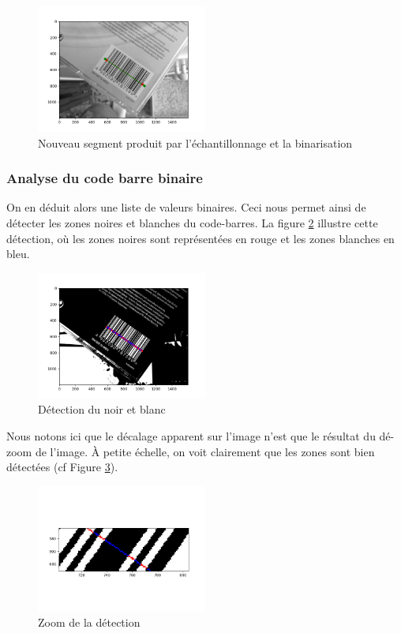 \documentclass{rapport}
\begin{document}
\begin{figure}[H] 
	\centering
	\includegraphics[width=0.5\textwidth]{images/binarisation.png}
	\caption{Nouveau segment produit par l'échantillonnage et la binarisation}
	\label{fig:binarisation}
\end{figure}

\subsubsection*{Analyse du code barre binaire}

On en déduit alors une liste de valeurs binaires. Ceci nous permet ainsi de détecter les zones noires et blanches du code-barres. 
La figure \ref{fig:detection} illustre cette détection, où les zones noires sont représentées en rouge et les zones blanches en bleu.

\begin{figure}[H] 
	\centering
	\includegraphics[width=0.5\textwidth]{images/code_seuille_couleur.png}
	\caption{Détection du noir et blanc}
	\label{fig:detection}
\end{figure}

Nous notons ici que le décalage apparent sur l'image n'est que le résultat du dé-zoom de l'image.
À petite échelle, on voit clairement que les zones sont bien détectées (cf Figure \ref{fig:detection_zoom}). 

\begin{figure}[H] 
	\centering
	\includegraphics[width=0.5\textwidth]{images/zoom_code_seuille_couleur.png}
	\caption{Zoom de la détection}
	\label{fig:detection_zoom}
\end{figure}
\end{document}
